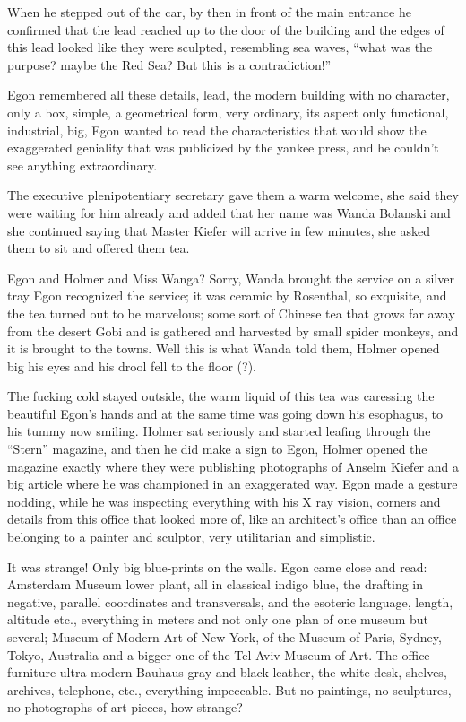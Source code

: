 \documentclass[smalldemyvopaper,11pt,twoside,onecolumn,openright,extrafontsizes]{memoir}
\begin{document}
When he stepped out of the car, by then in front of the main entrance he confirmed that the lead reached up to the door of the building and the edges of this lead looked like they were sculpted, resembling sea waves, “what was the purpose? maybe the Red Sea? But this is a contradiction!” 

Egon remembered all these details, lead, the modern building with no character, only a box, simple, a geometrical form, very ordinary, its aspect only functional, industrial, big, Egon wanted to read the characteristics that would show the exaggerated geniality that was publicized  by the yankee press, and he couldn’t see anything extraordinary.

The executive plenipotentiary secretary gave them a warm welcome, she said they were waiting for him already and added that her name was Wanda Bolanski and she continued saying that Master Kiefer will arrive in few minutes, she asked them to sit and offered them tea.

Egon and Holmer and Miss Wanga? Sorry, Wanda brought the service on a silver tray Egon recognized the service; it was ceramic by Rosenthal, so exquisite, and the tea turned out to be marvelous; some sort of Chinese tea that grows far away from the desert Gobi and is gathered and harvested by small spider monkeys, and it is brought to the towns. Well this is what Wanda told them, Holmer opened big his eyes and his drool fell to the floor (?).

The fucking cold stayed outside, the warm liquid of this tea was caressing the beautiful Egon’s hands and at the same time was going down his esophagus, to his tummy now smiling. Holmer sat seriously and started leafing through the “Stern” magazine, and then he did make a sign to Egon, Holmer opened the magazine exactly where they were publishing photographs of Anselm Kiefer and a big article where he was championed in an exaggerated way. Egon made a gesture nodding, while he was inspecting everything with his X ray vision, corners and details from this office that looked more of, like an architect’s office than an office belonging to a painter and sculptor, very utilitarian and simplistic.

It was strange! Only big blue-prints on the walls. Egon came close and read: Amsterdam Museum lower plant, all in classical indigo blue, the drafting in negative, parallel coordinates and transversals, and the esoteric language, length, altitude etc., everything in meters and not only one plan of one museum but several; Museum of Modern Art of New York, of the Museum of Paris, Sydney, Tokyo, Australia and a bigger one of the Tel-Aviv Museum of Art. The office furniture ultra modern Bauhaus gray and black leather, the white desk, shelves, archives, telephone, etc., everything impeccable. But no paintings, no sculptures, no photographs of art pieces, how strange?
\end{document}
